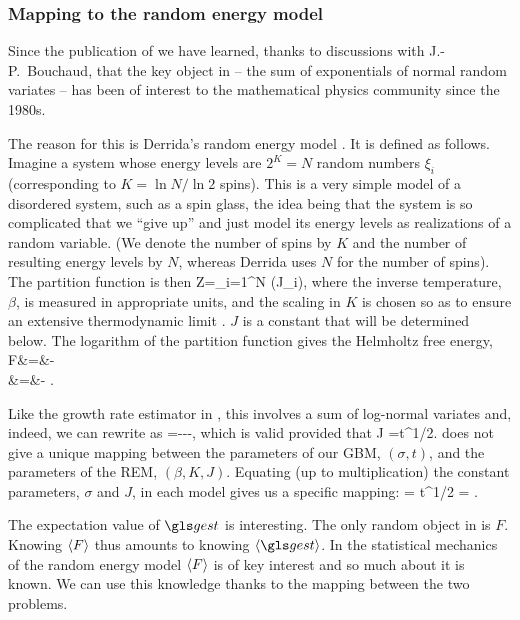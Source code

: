 \subsubsection{Mapping to the random energy model}
Since the publication of \cite{PetersKlein2013} we have learned, thanks to discussions with J.-P.~Bouchaud, 
that the key object in  -- the sum of exponentials of normal random variates -- has been of
interest to the mathematical physics community since the 1980s. 

The reason for this is Derrida's random energy model \cite{Derrida1980,Derrida1981}. It is defined as follows. 
Imagine a system whose energy levels are $2^K=N$ random numbers $\xi_i$ (corresponding to $K=\ln N/\ln 2$ spins). This is
a very simple model of a disordered system, such as a spin glass, the idea being that the system is so complicated
that we ``give up'' and just model its energy levels as realizations of a random variable. (We denote the number 
of spins by $K$ and the number of resulting energy levels by $N$, whereas Derrida uses $N$ for the number of spins).
The partition function is then
\be
Z=\sum_{i=1}^N \exp\left(\beta J\xi_i\right),
\ee
where the inverse temperature, $\beta$, is measured in appropriate units, and the scaling in $K$ is chosen
so as to ensure an extensive thermodynamic limit \cite[p.~79]{Derrida1980}. $J$ is a constant that will be determined below.
The logarithm of the partition function gives the Helmholtz free energy, 
\bea
F&=&-\\
&=&-  \ln\left[\sum_{i=1}^N \exp\left(\beta J \sqrt{\frac{K}{2}}\xi_i\right)\right].
\eea

Like the growth rate estimator in , this involves a sum of 
log-normal variates and, indeed, we can rewrite  as
\be
\gest=\mu---,
\ee
which is valid provided that
\be
\beta J =\sigma t^{1/2}.
\ee
{} does not give a unique mapping between the parameters of our GBM, $(\sigma, t)$, and the parameters of the REM, $(\beta, K, J)$. Equating (up to multiplication) the constant parameters, $\sigma$ and $J$, in each model gives us a specific mapping:
\be
\sigma= \quad {} \quad t^{1/2} = \beta{}.
\ee



The expectation value of $\gest$ is interesting. The only random object
in  is $F$. Knowing $\left\langle F \right\rangle$ thus amounts to knowing $\ave{\gest}$.
In the statistical mechanics of the random energy model $\left\langle F \right\rangle$ is of key
interest and so much about it is known. We can use this knowledge
thanks to the mapping between the two problems.

